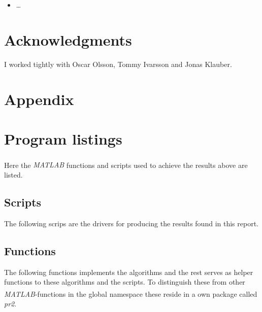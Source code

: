 \documentclass[10pt, a4paper]{article}
\newcommand{\matlab}{\small{\emph{MATLAB\textsuperscript{\textregistered}}}}
\begin{document}
\begin{itemize}
	\item \ldots
\end{itemize}


\section{Acknowledgments}

I worked tightly with Oscar Olsson, Tommy Ivarsson and Jonas Klauber.

{}


\newpage
\section*{Appendix}
\appendix
\section{Program listings} \label{appendix+programs}
Here the \matlab{} functions and scripts used to achieve the results above are listed.

\subsection{Scripts}
The following scrips are the drivers for producing the results found in this report.



\subsection{Functions}
The following functions implements the algorithms and the rest serves as helper functions to these algorithms and the scripts. To distinguish these from other \matlab{}-functions in the global namespace these reside in a own package called \emph{pr2}.

%
\end{document}
